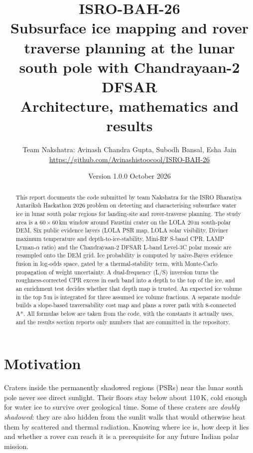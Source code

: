 \documentclass[11pt,a4paper]{article}
\title{\textbf{ISRO-BAH-26}\\[4pt]\large Subsurface ice mapping and rover traverse planning
at the lunar south pole with Chandrayaan-2 DFSAR\\[2pt]
\normalsize Architecture, mathematics and results}
\author{Team Nakshatra: Avinash Chandra Gupta, Subodh Bansal, Esha Jain\\
\small \url{https://github.com/Avinashistoocool/ISRO-BAH-26}}
\date{Version 1.0.0 \quad October 2026}
\begin{document}
\maketitle

\begin{abstract}
This report documents the code submitted by team Nakshatra for the ISRO Bharatiya Antariksh
Hackathon 2026 problem on detecting and characterising subsurface water ice in lunar south polar
regions for landing-site and rover-traverse planning. The study area is a
$60\times60$\,km window around Faustini crater on the LOLA 20\,m south-polar DEM. Six public
evidence layers (LOLA PSR map, LOLA solar visibility, Diviner maximum temperature and
depth-to-ice-stability, Mini-RF S-band CPR, LAMP Lyman-$\alpha$ ratio) and the Chandrayaan-2 DFSAR
L-band Level-3C polar mosaic are resampled onto the DEM grid. Ice probability is computed by
naive-Bayes evidence fusion in log-odds space, gated by a thermal-stability term, with
Monte-Carlo propagation of weight uncertainty. A dual-frequency (L/S) inversion turns the
roughness-corrected CPR excess in each band into a depth to the top of the ice, and an
enrichment test decides whether that depth map is trusted. An expected ice volume in the top
5\,m is integrated for three assumed ice volume fractions. A separate module builds a
slope-based traversability cost map and plans a rover path with 8-connected A*. All formulas
below are taken from the code, with the constants it actually uses, and the results section
reports only numbers that are committed in the repository.
\end{abstract}

\tableofcontents
\newpage

\section{Motivation}

Craters inside the permanently shadowed regions (PSRs) near the lunar south pole never see direct
sunlight. Their floors stay below about 110\,K, cold enough for water ice to survive over
geological time. Some of these craters are \emph{doubly shadowed}: they are also hidden from
the sunlit walls that would otherwise heat them by scattered and thermal radiation. Knowing
where ice is, how deep it lies and whether a rover can reach it is a prerequisite for any future
Indian polar mission.
\end{document}
